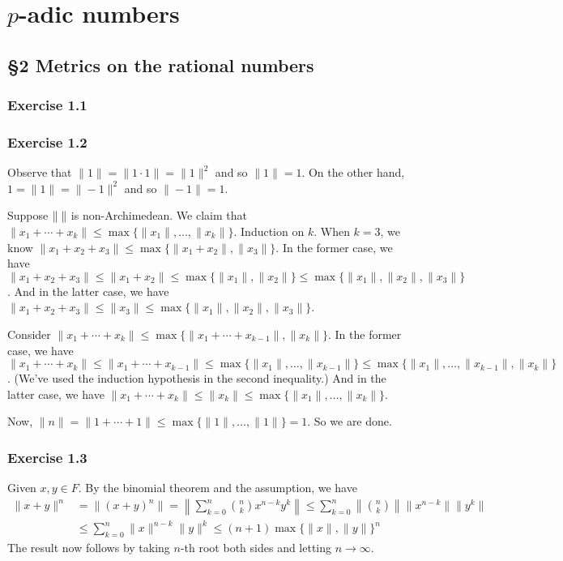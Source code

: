 \documentclass[../Koblitz.tex]{subfiles}
\begin{document}
\chapter{\texorpdfstring{$p$}{p}-adic numbers}

\section*{\S2 Metrics on the rational numbers}

\subsection*{Exercise 1.1}

\subsection*{Exercise 1.2}

Observe that $\|1\|=\|1\cdot1\|=\|1\|^2$ and so $\|1\|=1$. On the other hand, $1=\|1\|=\|-1\|^2$ and so $\|-1\|=1$.

Suppose $\|\;\|$ is non-Archimedean. We claim that $\|x_1+\cdots+x_k\| \leq \max{\{\|x_1\|,\ldots,\|x_k\|\}}$. Induction on $k$. When $k=3$, we know $\|x_1+x_2+x_3\| \leq \max\{\|x_1+x_2\|,\|x_3\|\}$. In the former case, we have $\|x_1+x_2+x_3\| \leq \|x_1+x_2\| \leq \max\{\|x_1\|,\|x_2\|\} \leq \max\{\|x_1\|,\|x_2\|,\|x_3\|\}$. And in the latter case, we have $\|x_1+x_2+x_3\| \leq \|x_3\| \leq \max\{\|x_1\|,\|x_2\|,\|x_3\|\}$.

Consider $\|x_1+\cdots+x_k\| \leq \max\{\|x_1+\cdots+x_{k-1}\|,\|x_k\|\}$. In the former case, we have $\|x_1+\cdots+x_k\| \leq \|x_1+\cdots+x_{k-1}\| \leq \max\{\|x_1\|,\ldots,\|x_{k-1}\|\} \leq \max\{\|x_1\|,\ldots,\|x_{k-1}\|,\|x_k\|\}$. (We've used the induction hypothesis in the second inequality.) And in the latter case, we have $\|x_1+\cdots+x_k\| \leq \|x_k\| \leq \max\{\|x_1\|,\ldots,\|x_k\|\}$.

Now, $\|n\|=\|1+\cdots+1\| \leq \max\{\|1\|,\ldots,\|1\|\}=1$. So we are done.

\subsection*{Exercise 1.3}

Given $x,y\in F$. By the binomial theorem and the assumption, we have 
\begin{align*}
    \|x+y\|^n &= \|(x+y)^n\| = \left\|\sum_{k=0}^n \binom{n}{k}x^{n-k}y^k\right\| \leq \sum_{k=0}^n \left\|\binom{n}{k}\right\|\|x^{n-k}\|\|y^k\| \\
    &\leq \sum_{k=0}^n \|x\|^{n-k} \|y\|^k \leq (n+1)\max\{\|x\|,\|y\|\}^n
\end{align*}
The result now follows by taking $n$-th root both sides and letting $n\to\infty$.
\end{document}
